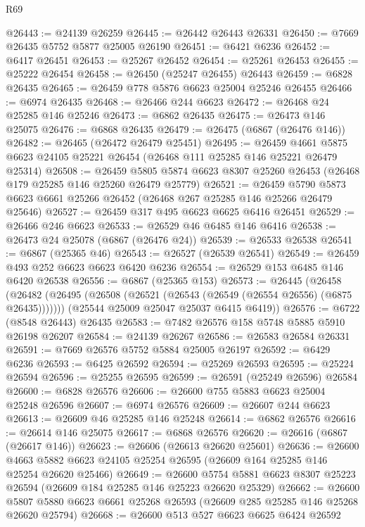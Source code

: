 \begin{lexlean}{R69}
\begin{coremodule}
{@26443 := @24139 @26259
@26445 := @26442 @26443 @26331
@26450 := @7669 @26435 @5752 @5877 @25005 @26190
@26451 := @6421 @6236
@26452 := @6417 @26451
@26453 := @25267 @26452
@26454 := @25261 @26453
@26455 := @25222 @26454
@26458 := @26450 (@25247 @26455) @26443
@26459 := @6828 @26435
@26465 := @26459 @778 @5876 @6623 @25004 @25246 @26455
@26466 := @6974 @26435
@26468 := @26466 @244 @6623
@26472 := @26468 @24 @25285 @146 @25246
@26473 := @6862 @26435
@26475 := @26473 @146 @25075
@26476 := @6868 @26435
@26479 := @26475 (@6867 (@26476 @146))
@26482 := @26465 (@26472 @26479 @25451)
@26495 := @26459
    @4661
    @5875
    @6623
    @24105
    @25221
    @26454
    (@26468 @111 @25285 @146 @25221 @26479 @25314)
@26508 := @26459
    @5805
    @5874
    @6623
    @8307
    @25260
    @26453
    (@26468 @179 @25285 @146 @25260 @26479 @25779)
@26521 := @26459
    @5790
    @5873
    @6623
    @6661
    @25266
    @26452
    (@26468 @267 @25285 @146 @25266 @26479 @25646)
@26527 := @26459 @317 @495 @6623 @6625 @6416 @26451
@26529 := @26466 @246 @6623
@26533 := @26529 @46 @6485 @146 @6416
@26538 := @26473 @24 @25078 (@6867 (@26476 @24))
@26539 := @26533 @26538
@26541 := @6867 (@25365 @46)
@26543 := @26527 (@26539 @26541)
@26549 := @26459 @493 @252 @6623 @6623 @6420 @6236
@26554 := @26529 @153 @6485 @146 @6420 @26538
@26556 := @6867 (@25365 @153)
@26573 := @26445
    (@26458
      (@26482 (@26495 (@26508 (@26521 (@26543 (@26549 (@26554 @26556) (@6875 @26435)))))))
      (@25544 @25009 @25047 @25037 @6415 @6419))
@26576 := @6722 (@8548 @26443) @26435
@26583 := @7482 @26576 @158 @5748 @5885 @5910 @26198 @26207
@26584 := @24139 @26267
@26586 := @26583 @26584 @26331
@26591 := @7669 @26576 @5752 @5884 @25005 @26197
@26592 := @6429 @6236
@26593 := @6425 @26592
@26594 := @25269 @26593
@26595 := @25224 @26594
@26596 := @25255 @26595
@26599 := @26591 (@25249 @26596) @26584
@26600 := @6828 @26576
@26606 := @26600 @755 @5883 @6623 @25004 @25248 @26596
@26607 := @6974 @26576
@26609 := @26607 @244 @6623
@26613 := @26609 @46 @25285 @146 @25248
@26614 := @6862 @26576
@26616 := @26614 @146 @25075
@26617 := @6868 @26576
@26620 := @26616 (@6867 (@26617 @146))
@26623 := @26606 (@26613 @26620 @25601)
@26636 := @26600
    @4663
    @5882
    @6623
    @24105
    @25254
    @26595
    (@26609 @164 @25285 @146 @25254 @26620 @25466)
@26649 := @26600
    @5754
    @5881
    @6623
    @8307
    @25223
    @26594
    (@26609 @184 @25285 @146 @25223 @26620 @25329)
@26662 := @26600
    @5807
    @5880
    @6623
    @6661
    @25268
    @26593
    (@26609 @285 @25285 @146 @25268 @26620 @25794)
@26668 := @26600 @513 @527 @6623 @6625 @6424 @26592
}
\end{coremodule}
\end{lexlean}
